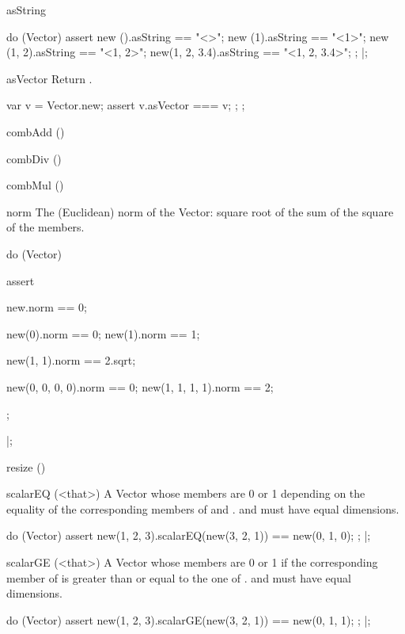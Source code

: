 \begin{urbiscriptapi}
\item[asString]%
\begin{urbiscript}
do (Vector)
{
  assert
  {
    new         ().asString == "<>";
    new        (1).asString == "<1>";
    new     (1, 2).asString == "<1, 2>";
    new(1, 2, 3.4).asString == "<1, 2, 3.4>";
  };
}|;
\end{urbiscript}

\item[asVector]%
  Return \this.
\begin{urbiscript}
{
  var v = Vector.new;
  assert { v.asVector === v; };
};
\end{urbiscript}

\item[combAdd]()%

\item[combDiv]()%

\item[combMul]()%

\item[norm]%
  The (Euclidean) norm of the Vector: square root of the sum of the square
  of the members.
\begin{urbiscript}
do (Vector)
{
  assert
  {
    new.norm == 0;

    new(0).norm == 0;
    new(1).norm == 1;

    new(1, 1).norm == 2.sqrt;

    new(0, 0, 0, 0).norm == 0;
    new(1, 1, 1, 1).norm == 2;
  };
}|;
\end{urbiscript}


\item[resize]()%

\item[scalarEQ](<that>)%
  A Vector whose members are 0 or 1 depending on the equality of the
  corresponding members of \this and \that.  \this and \that must have equal
  dimensions.
\begin{urbiscript}
do (Vector)
{
  assert
  {
    new(1, 2, 3).scalarEQ(new(3, 2, 1)) == new(0, 1, 0);
  };
}|;
\end{urbiscript}

\item[scalarGE](<that>)%
  A Vector whose members are 0 or 1 if the corresponding member of \this is
  greater than or equal to the one of \that.  \this and \that must have equal
  dimensions.
\begin{urbiscript}
do (Vector)
{
  assert
  {
    new(1, 2, 3).scalarGE(new(3, 2, 1)) == new(0, 1, 1);
  };
}|;
\end{urbiscript}


\end{urbiscriptapi}
